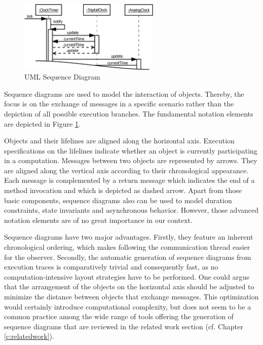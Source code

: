 \begin{figure}
	\centering
	\includegraphics[width=0.6\textwidth]{../images/02-Sequence}
	\caption[TOC Caption]{UML Sequence Diagram}
	\label{fig:ModelingSequence}
\end{figure}

Sequence diagrams \cite{rumbaugh_unified_2010} are used to model the interaction of objects.
Thereby, the focus is on the exchange of messages in a specific scenario rather than the depiction of all possible execution branches.
The fundamental notation elements are depicted in Figure \ref{fig:ModelingSequence}.

Objects and their lifelines are aligned along the horizontal axis.
Execution specifications on the lifelines indicate whether an object is currently participating in a computation.
Messages between two objects are represented by arrows.
They are aligned along the vertical axis according to their chronological appearance.
Each message is complemented by a return message which indicates the end of a method invocation and which is depicted as dashed arrow.
Apart from those basic components, sequence diagrams also can be used to model duration constraints, state invariants and asynchronous behavior.
However, those advanced notation elements are of no great importance in our context.

Sequence diagrams have two major advantages.
Firstly, they feature an inherent chronological ordering, which makes following the communication thread easier for the observer.
Secondly, the automatic generation of sequence diagrams from execution traces is comparatively trivial and consequently fast, as no computation-intensive layout strategies have to be performed.
One could argue that the arrangement of the objects on the horizontal axis should be adjusted to minimize the distance between objects that exchange messages.
This optimization would certainly introduce computational complexity, but does not seem to be a common practice among the wide range of tools offering the generation of sequence diagrams that are reviewed in the related work section (cf. Chapter \ref{c:relatedwork}).

